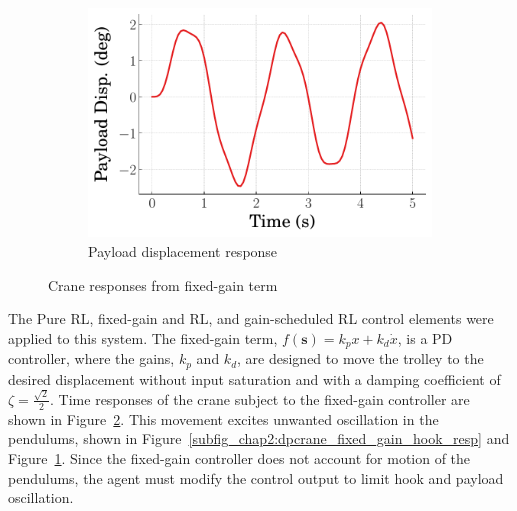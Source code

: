 \begin{figure}[tb]
\begin{subfigure}[b]{0.49\textwidth}
    \end{subfigure}
    \hfill
    \begin{subfigure}[b]{0.49\textwidth}
        \centering
        \includegraphics[width=\textwidth]{figures/figures_RL_model_based_control/time_responses_crane/dpcrane_fixed_gain/Payload_displacement_0p185_init_300000_steps.pdf}
        \caption{Payload displacement response}
        \label{subfig_chap2:dpcrane_fixed_gain_payload_resp}
    \end{subfigure}
    \hfill
    \caption{Crane responses from fixed-gain term}
    \label{fig_chap2:dpcrane_fixed_gain_resp}
\end{figure}
%

The Pure RL, fixed-gain and RL, and gain-scheduled RL control elements were applied to this system. The fixed-gain term, $f(\boldsymbol{s})=k_p x + k_d \dot{x}$, is a PD controller, where the gains, $k_p$ and $k_d$, are designed to move the trolley to the desired displacement without input saturation and with a damping coefficient of $\zeta=\frac{\sqrt{2}}{2}$.
%
Time responses of the crane subject to the fixed-gain controller are shown in Figure~\ref{fig_chap2:dpcrane_fixed_gain_resp}. This movement excites unwanted oscillation in the pendulums, shown in Figure~\ref{subfig_chap2:dpcrane_fixed_gain_hook_resp} and Figure~\ref{subfig_chap2:dpcrane_fixed_gain_payload_resp}. Since the fixed-gain controller does not account for motion of the pendulums, the agent must modify the control output to limit hook and payload oscillation.
%

